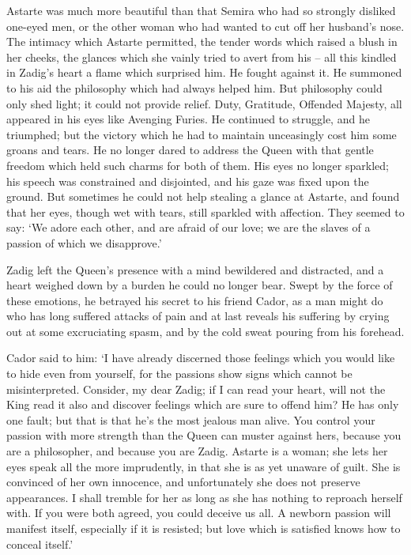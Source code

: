 \documentclass{article}
\begin{document}
\begin{center}
Astarte was much more beautiful than that Semira who had so strongly disliked one-eyed 
men, or the other woman who had wanted to cut off her husband's nose. The intimacy 
which Astarte permitted, the tender words which raised a blush in her cheeks, the 
glances which she vainly tried to avert from his – all this kindled in Zadig's 
heart a flame which surprised him. He fought against it. He summoned to his aid 
the philosophy which had always helped him. But philosophy could only shed light; 
it could not provide relief. Duty, Gratitude, Offended Majesty, all appeared in 
his eyes like Avenging Furies. He continued to struggle, and he triumphed; but 
the victory which he had to maintain unceasingly cost him some groans and tears. 
He no longer dared to address the Queen with that gentle freedom which held such 
charms for both of them. His eyes no longer sparkled; his speech was constrained 
and disjointed, and his gaze was fixed upon the ground. But sometimes he could 
not help stealing a glance at Astarte, and found that her eyes, though wet with 
tears, still sparkled with affection. They seemed to say: `We adore each other, 
and are afraid of our love; we are the slaves of a passion of which we disapprove.' 

Zadig left the Queen's presence with a mind bewildered and distracted, and a heart 
weighed down by a burden he could no longer bear. Swept by the force of these emotions, 
he betrayed his secret to his friend Cador, as a man might do who has long suffered 
attacks of pain and at last reveals his suffering by crying out at some excruciating 
spasm, and by the cold sweat pouring from his forehead. 

Cador said to him: `I have already discerned those feelings which you would like 
to hide even from yourself, for the passions show signs which cannot be misinterpreted. 
Consider, my dear Zadig; if I can read your heart, will not the King read it also 
and discover feelings which are sure to offend him? He has only one fault; but 
that is that he's the most jealous man alive. You control your passion with more 
strength than the Queen can muster against hers, because you are a philosopher, 
and because you are Zadig. Astarte is a woman; she lets her eyes speak all the 
more imprudently, in that she is as yet unaware of guilt. She is convinced of her 
own innocence, and unfortunately she does not preserve appearances. I shall tremble 
for her as long as she has nothing to reproach herself with. If you were both agreed, 
you could deceive us all. A newborn passion will manifest itself, especially if 
it is resisted; but love which is satisfied knows how to conceal itself.' 


\end{center}
\end{document}
